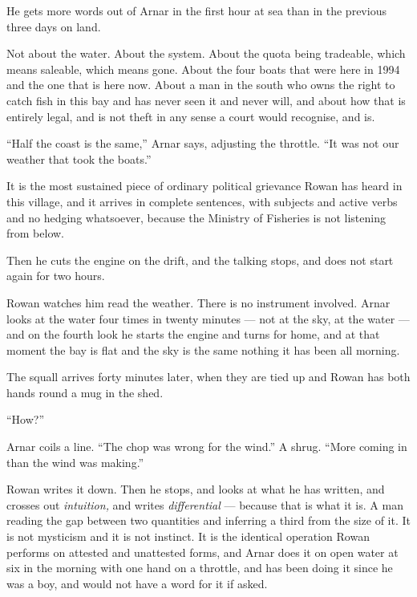 \documentclass[11pt,oneside]{book}
\newcommand{\sceneline}{%
  \par\vspace{1.2em}
  \begin{center}
    \fontsize{11}{11}\selectfont \textbullet\quad\textbullet\quad\textbullet
  \end{center}
  \vspace{0.6em}\noindent\ignorespaces
}
\begin{document}
He gets more words out of Arnar in the first hour at sea than in the
previous three days on land.

Not about the water. About the system. About the quota being tradeable,
which means saleable, which means gone. About the four boats that were
here in 1994 and the one that is here now. About a man in the south who
owns the right to catch fish in this bay and has never seen it and never
will, and about how that is entirely legal, and is not theft in any
sense a court would recognise, and is.

``Half the coast is the same,'' Arnar says, adjusting the throttle. ``It
was not our weather that took the boats.''

It is the most sustained piece of ordinary political grievance Rowan has
heard in this village, and it arrives in complete sentences, with
subjects and active verbs and no hedging whatsoever, because the
Ministry of Fisheries is not listening from below.

Then he cuts the engine on the drift, and the talking stops, and does
not start again for two hours.

Rowan watches him read the weather. There is no instrument involved.
Arnar looks at the water four times in twenty minutes --- not at the
sky, at the water --- and on the fourth look he starts the engine and
turns for home, and at that moment the bay is flat and the sky is the
same nothing it has been all morning.

The squall arrives forty minutes later, when they are tied up and Rowan
has both hands round a mug in the shed.

``How?''

Arnar coils a line. ``The chop was wrong for the wind.'' A shrug. ``More
coming in than the wind was making.''

Rowan writes it down. Then he stops, and looks at what he has written,
and crosses out \emph{intuition,} and writes \emph{differential} ---
because that is what it is. A man reading the gap between two
quantities and inferring a third from the size of it. It is not
mysticism and it is not instinct. It is the identical operation Rowan
performs on attested and unattested forms, and Arnar does it on open
water at six in the morning with one hand on a throttle, and has been
doing it since he was a boy, and would not have a word for it if asked.

\sceneline
\end{document}
